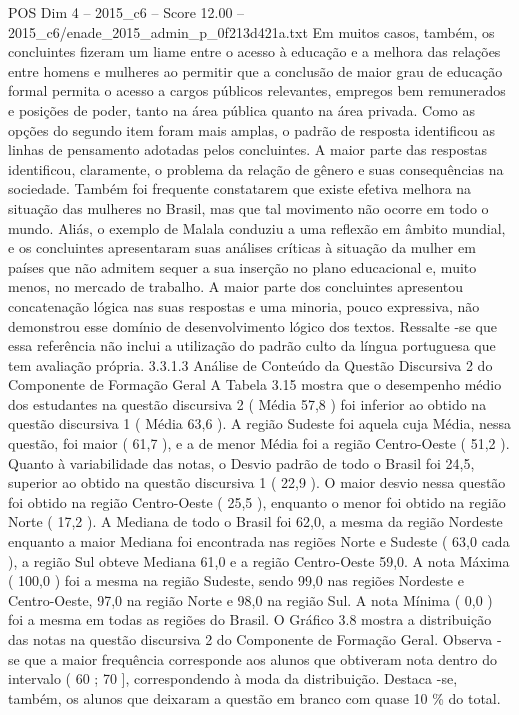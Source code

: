 \begin{textsample}{POS Dim 4 – 2015\_c6 – Score 12.00 – 2015\_c6/enade\_2015\_admin\_p\_0f213d421a.txt}
Em muitos casos, também, os concluintes fizeram um liame entre o acesso à educação e a melhora das relações entre homens e mulheres ao permitir que a conclusão de maior grau de educação formal permita o acesso a cargos públicos relevantes, empregos bem remunerados e posições de poder, tanto na área pública quanto na área privada.
Como as opções do segundo item foram mais amplas, o padrão de resposta identificou as linhas de pensamento adotadas pelos concluintes.
A maior parte das respostas identificou, claramente, o problema da relação de gênero e suas consequências na sociedade.
Também foi frequente constatarem que existe efetiva melhora na situação das mulheres no Brasil, mas que tal movimento não ocorre em todo o mundo.
Aliás, o exemplo de Malala conduziu a uma reflexão em âmbito mundial, e os concluintes apresentaram suas análises críticas à situação da mulher em países que não admitem sequer a sua inserção no plano educacional e, muito menos, no mercado de trabalho.
A maior parte dos concluintes apresentou concatenação lógica nas suas respostas e uma minoria, pouco expressiva, não demonstrou esse domínio de desenvolvimento lógico dos textos.
Ressalte -se que essa referência não inclui a utilização do padrão culto da língua portuguesa que tem avaliação própria. 3.3.1.3 Análise de Conteúdo da Questão Discursiva 2 do Componente de Formação Geral A Tabela 3.15 mostra que o desempenho médio dos estudantes na questão discursiva 2 ( Média 57,8 ) foi inferior ao obtido na questão discursiva 1 ( Média 63,6 ).
A região Sudeste foi aquela cuja Média, nessa questão, foi maior ( 61,7 ), e a de menor Média foi a região Centro-Oeste ( 51,2 ).
Quanto à variabilidade das notas, o Desvio padrão de todo o Brasil foi 24,5, superior ao obtido na questão discursiva 1 ( 22,9 ).
O maior desvio nessa questão foi obtido na região Centro-Oeste ( 25,5 ), enquanto o menor foi obtido na região Norte ( 17,2 ).
A Mediana de todo o Brasil foi 62,0, a mesma da região Nordeste enquanto a maior Mediana foi encontrada nas regiões Norte e Sudeste ( 63,0 cada ), a região Sul obteve Mediana 61,0 e a região Centro-Oeste 59,0.
A nota Máxima ( 100,0 ) foi a mesma na região Sudeste, sendo 99,0 nas regiões Nordeste e Centro-Oeste, 97,0 na região Norte e 98,0 na região Sul.
A nota Mínima ( 0,0 ) foi a mesma em todas as regiões do Brasil.
O Gráfico 3.8 mostra a distribuição das notas na questão discursiva 2 do Componente de Formação Geral.
Observa -se que a maior frequência corresponde aos alunos que obtiveram nota dentro do intervalo ( 60 ; 70 ], correspondendo à moda da distribuição.
Destaca -se, também, os alunos que deixaram a questão em branco com quase 10 \% do total.

\end{textsample}
